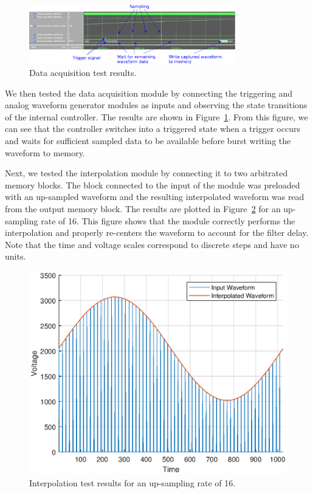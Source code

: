 \documentclass[journal]{IEEEtran}
\begin{document}
\begin{figure}[!htb]
  \centering
  \includegraphics[width=0.8\textwidth]{test-results/data_acquisition_test.png}
  \caption{Data acquisition test results.}
  \label{fig:data_acq_test}
\end{figure}

We then tested the data acquisition module by connecting the triggering and analog waveform generator modules as inputs and observing the state transitions of the internal controller. The results are shown in Figure~\ref{fig:data_acq_test}. From this figure, we can see that the controller switches into a triggered state when a trigger occurs and waits for sufficient sampled data to be available before burst writing the waveform to memory.

Next, we tested the interpolation module by connecting it to two arbitrated memory blocks. The block connected to the input of the module was preloaded with an up-sampled waveform and the resulting interpolated waveform was read from the output memory block. The results are plotted in Figure~\ref{fig:interpol_test} for an up-sampling rate of 16. This figure shows that the module correctly performs the interpolation and properly re-centers the waveform to account for the filter delay. Note that the time and voltage scales correspond to discrete steps and have no units.

\begin{figure}[!htb]
  \centering
  \includegraphics[width=\columnwidth]{test-results/interpolation.eps}
  \caption{Interpolation test results for an up-sampling rate of 16.}
  \label{fig:interpol_test}
\end{figure}
\end{document}
